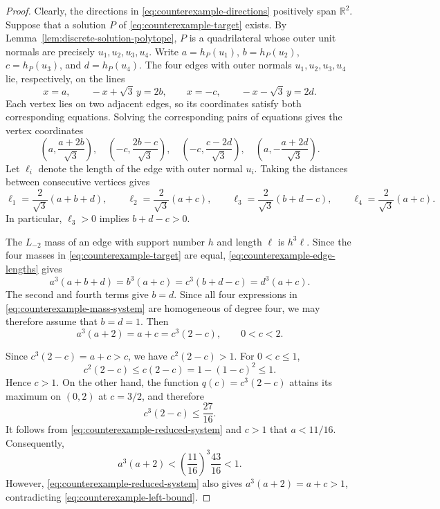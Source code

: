 \documentclass[12pt,reqno]{amsart}
\numberwithin{equation}{section}
\theoremstyle{remark}
\newcommand{\R}{\mathbb R}
\begin{document}
\begin{proof}
Clearly, the directions in \eqref{eq:counterexample-directions}
positively span \(\R^2\).
	Suppose that a solution \(P\) of
	\eqref{eq:counterexample-target} exists. By
	Lemma~\ref{lem:discrete-solution-polytope}, \(P\) is a
	quadrilateral whose outer unit normals are precisely
	\(u_1,u_2,u_3,u_4\). Write \(a=h_P(u_1)\), \(b=h_P(u_2)\), \(c=h_P(u_3)\), and
	\(d=h_P(u_4)\).
	The four edges with outer normals \(u_1,u_2,u_3,u_4\) lie,
	respectively, on the lines
	\[
	x=a,\qquad
	-x+\sqrt3\,y=2b,\qquad
	x=-c,\qquad
	-x-\sqrt3\,y=2d.
	\]
	Each vertex lies on two adjacent edges, so its coordinates satisfy
	both corresponding equations. Solving the corresponding pairs of equations gives the vertex coordinates
	\[
	\left(a,\frac{a+2b}{\sqrt3}\right),
	\quad
	\left(-c,\frac{2b-c}{\sqrt3}\right),
	\quad
	\left(-c,\frac{c-2d}{\sqrt3}\right),
	\quad
	\left(a,-\frac{a+2d}{\sqrt3}\right).
	\]
	Let \(\ell_i\) denote the length of the edge with outer normal
	\(u_i\). Taking the distances between consecutive vertices gives
	\begin{equation}\label{eq:counterexample-edge-lengths}
		\ell_1=\frac{2}{\sqrt3}(a+b+d),
		\qquad
		\ell_2=\frac{2}{\sqrt3}(a+c),
		\qquad
		\ell_3=\frac{2}{\sqrt3}(b+d-c),
		\qquad
		\ell_4=\frac{2}{\sqrt3}(a+c).
	\end{equation}
	In particular, \(\ell_3>0\) implies \(b+d-c>0\).
	
	The \(L_{-2}\) mass of an edge with support number
	\(h\) and length \(\ell\) is \(h^3\ell\). Since the four masses in
	\eqref{eq:counterexample-target} are equal, 
	\eqref{eq:counterexample-edge-lengths} gives
	\begin{equation}\label{eq:counterexample-mass-system}
		a^3(a+b+d)
		=
		b^3(a+c)
		=
		c^3(b+d-c)
		=
		d^3(a+c).
	\end{equation}
	The second and fourth terms give \(b=d\). Since all four
	expressions in \eqref{eq:counterexample-mass-system} are
	homogeneous of degree four, we may
	therefore assume that \(b=d=1\). Then
	\begin{equation}\label{eq:counterexample-reduced-system}
		a^3(a+2)
		=
		a+c
		=
		c^3(2-c),
		\qquad
		0<c<2.
	\end{equation}
	
	Since \(c^3(2-c)=a+c>c\), we have
	\(c^2(2-c)>1\). For \(0<c\leq1\),
	\[
	c^2(2-c)
	\leq
	c(2-c)
	=
	1-(1-c)^2
	\leq1.
	\]
	Hence \(c>1\). On the other hand, the function
	\(q(c)=c^3(2-c)\) attains its maximum on \((0,2)\) at
	\(c=3/2\), and therefore
	\[
	c^3(2-c)\leq\frac{27}{16}.
	\]
	It follows from \eqref{eq:counterexample-reduced-system} and
	\(c>1\) that \(a<11/16\). Consequently,
	\begin{equation}\label{eq:counterexample-left-bound}
		a^3(a+2)
		<
		\left(\frac{11}{16}\right)^3
		\frac{43}{16}
		<
		1.
	\end{equation}
	However, \eqref{eq:counterexample-reduced-system} also gives
	\(a^3(a+2)=a+c>1\), contradicting
	\eqref{eq:counterexample-left-bound}.
\end{proof}
\end{document}
